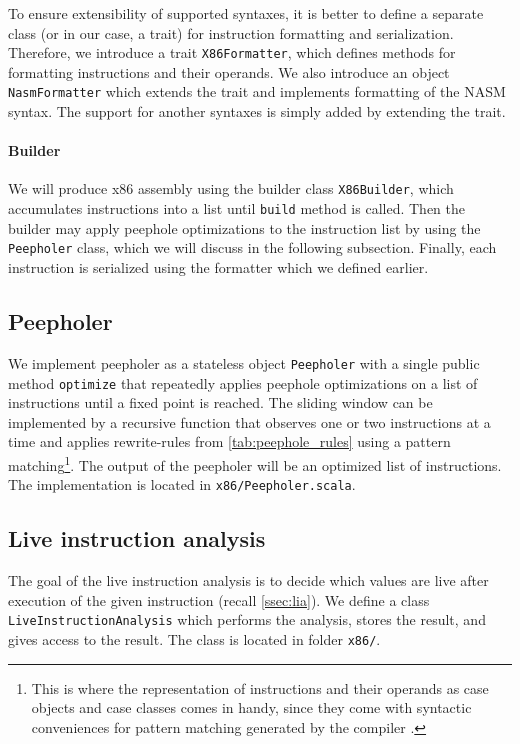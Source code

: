 \documentclass[thesis=M,english]{FITthesis}[2019/12/23]
\begin{document}
To ensure extensibility of supported syntaxes, it is better to define a separate class (or in our case, a trait) for instruction formatting and serialization. Therefore, we introduce a trait \texttt{X86Formatter}, which defines methods for formatting instructions and their operands. We also introduce an object \texttt{NasmFormatter} which extends the trait and implements formatting of the NASM syntax. The support for another syntaxes is simply added by extending the trait.

\paragraph*{Builder} We will produce x86 assembly using the builder class \texttt{X86Builder}, which accumulates instructions into a list until \texttt{build} method is called. Then the builder may apply peephole optimizations to the instruction list by using the \texttt{Peepholer} class, which we will discuss in the following subsection. Finally, each instruction is serialized using the formatter which we defined earlier.

\subsection{Peepholer}\label{ssec:peepholer}
We implement peepholer as a stateless object \texttt{Peepholer} with a single public method \texttt{optimize} that repeatedly applies peephole optimizations on a list of instructions until a fixed point is reached. The sliding window can be implemented by a recursive function that observes one or two instructions at a time and applies rewrite-rules from \autoref{tab:peephole_rules} using a pattern matching\footnote{This is where the representation of instructions and their operands as case objects and case classes comes in handy, since they come with syntactic conveniences for pattern matching generated by the compiler \cite[Chap. 15]{scala}.}. The output of the peepholer will be an optimized list of instructions. The implementation is located in \texttt{x86/Peepholer.scala}.

\subsection{Live instruction analysis}
The goal of the live instruction analysis is to decide which values are live after execution of the given instruction (recall \autoref{ssec:lia}). We define a class \texttt{LiveInstructionAnalysis} which performs the analysis, stores the result, and gives access to the result. The class is located in folder \texttt{x86/}.
\end{document}
